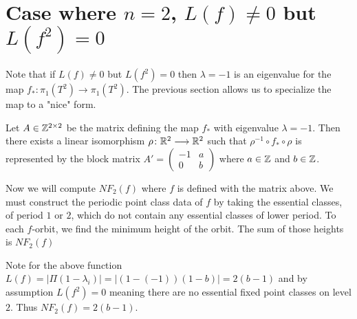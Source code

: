 \documentclass[11pt,oneside,draft]{amsart}
\numberwithin{equation}{section} %
\numberwithin{figure}{section} %
\begin{document}
\section*{ Case where \texorpdfstring{$n=2$}{n}, \texorpdfstring{$L(f)\not =0$}{L(f)} but \texorpdfstring{$L(f^2)=0$}{L(f)}}

{Note that if $L(f)\not =0$ but $L(f^2)=0$ then $\lambda=-1$ is an 
eigenvalue for the map $f_*  \colon  \pi_1(T^2)\rightarrow \pi_1(T^2)$. The 
previous section allows us to specialize the map to a "nice" form. }


\begin{lem}\label{nice_form}
	Let $ A\in \mathbb{Z}^{2\times 2}$  be the matrix defining the map $f_*$ 
with eigenvalue $\lambda=-1$. Then there exists a linear isomorphism $\rho  \colon \mathbb{R}^2\longrightarrow\mathbb{R}^2$ such that $\rho ^{-1} \circ f_* \circ \rho$ 
is represented by the block matrix $ A'= \left( \begin{array}{ccc}
-1 & a \\
0 & b  \end{array} \right)$ where $a\in \mathbb{Z}$ and $ b \in \mathbb{Z}$.
\end{lem}

Now we will compute $NF_2(f)$ where $f$ is defined with the matrix above. We must construct 
the periodic point class data of $f$ by taking the essential classes, of period $1$ or $2$, 
which do not contain any essential classes of lower period. To each $f$-orbit, we find the 
minimum height of the orbit. The sum of those heights is $NF_2(f)$

\begin{eg}
Note for the above function $L(f)=|\Pi (1-\lambda_i)|=|(1-(-1))(1-b)|=2(b-1)$ and by assumption $L(f^2)=0$ meaning there are no essential fixed point classes on level $2$. Thus $NF_2(f)=2(b-1)$.
\end{eg}


\end{document}
